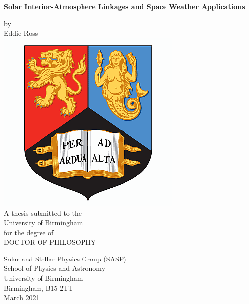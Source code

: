 \begin{titlepage}
\vspace{6cm}
\begin{center}
\begin{doublespace}
{\Huge \bf Solar Interior-Atmosphere Linkages and Space Weather Applications}
\end{doublespace}
\vspace{1cm}
by\\
\vspace{1cm}
{\Large Eddie Ross}\\
\vspace{2.5cm}
\includegraphics[scale=0.35]{onlyunilogo.png}\\
\vspace{2.5cm}
A thesis submitted to the \\
University of Birmingham \\
for the degree of \\
DOCTOR OF PHILOSOPHY\\
\end{center}
\vfill
\begin{flushright}     
Solar and Stellar Physics Group (SASP)\\
School of Physics and Astronomy \\
University of Birmingham \\
Birmingham, B15 2TT\\
March 2021\\
\vfill
\end{flushright}
\end{titlepage}
